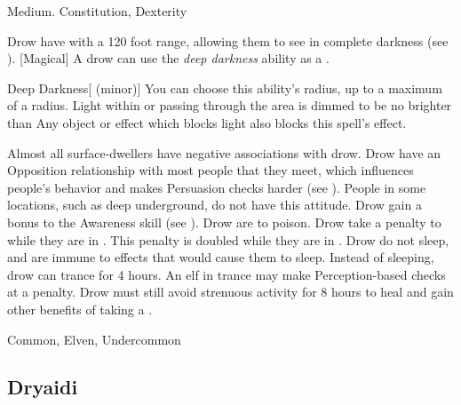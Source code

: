          Medium.
          Constitution,  Dexterity
        \begin{itemize}
             Drow have  with a 120 foot range, allowing them to see in complete darkness (see ).
            [Magical] A drow can use the \textit{deep darkness} ability as a .
                \begin{durationability}{Deep Darkness}[ (minor)]
                    \rankline
                    You can choose this ability's radius, up to a maximum of a \areamed radius.
                    Light within or passing through the area is dimmed to be no brighter than 
                    Any object or effect which blocks light also blocks this spell's effect.
                \end{durationability}
             Almost all surface-dwellers have negative associations with drow.
                Drow have an Opposition relationship with most people that they meet, which influences people's behavior and makes Persuasion checks harder (see ).
                People in some locations, such as deep underground, do not have this attitude.
             Drow gain a  bonus to the Awareness skill (see ).
             Drow are  to poison.
             Drow take a  penalty to  while they are in .
                This penalty is doubled while they are in .
             Drow do not sleep, and are immune to  effects that would cause them to sleep.
                Instead of sleeping, drow can trance for 4 hours.
                An elf in trance may make Perception-based checks at a  penalty.
                Drow must still avoid strenuous activity for 8 hours to heal and gain other benefits of taking a .
        \end{itemize}
         Common, Elven, Undercommon

    \subsection{Dryaidi}

